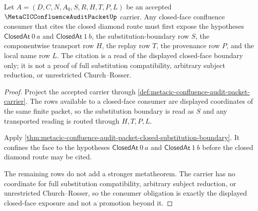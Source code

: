 \begin{theorem}
\label{thm:metacic-confluence-audit-closed-face-obligations}
Let $A=(D,C,N,A_0,S,R,H,T,P,L)$ be an accepted
$\MetaCICConfluenceAuditPacketUp$ carrier. Any closed-face confluence consumer
that cites the closed diamond route must first expose the hypotheses
$\mathsf{ClosedAt}\ 0\ a$ and $\mathsf{ClosedAt}\ 1\ b$, the
substitution-boundary row $S$, the componentwise transport row $H$, the replay
row $T$, the provenance row $P$, and the local name row $L$. The citation is a
read of the displayed closed-face boundary only; it is not a proof of full
substitution compatibility, arbitrary subject reduction, or unrestricted
Church--Rosser.
\end{theorem}
\begin{proof}
Project the accepted carrier through
\autoref{def:metacic-confluence-audit-packet-carrier}. The rows available to a
closed-face consumer are displayed coordinates of the same finite packet, so
the substitution boundary is read as $S$ and any transported reading is routed
through $H,T,P,L$.

Apply
\autoref{thm:metacic-confluence-audit-packet-closed-substitution-boundary}.
It confines the face to the hypotheses $\mathsf{ClosedAt}\ 0\ a$ and
$\mathsf{ClosedAt}\ 1\ b$ before the closed diamond route may be cited.

The remaining rows do not add a stronger metatheorem. The carrier has no
coordinate for full substitution compatibility, arbitrary subject reduction,
or unrestricted Church--Rosser, so the consumer obligation is exactly the
displayed closed-face exposure and not a promotion beyond it.
\end{proof}


